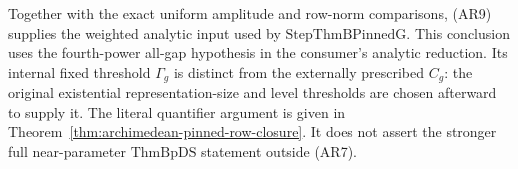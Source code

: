 Together with the exact uniform amplitude and row-norm
comparisons, (AR9) supplies the weighted analytic input
used by \(\mathrm{StepThmBPinnedG}\).  This conclusion uses the fourth-power all-gap hypothesis in the
consumer's analytic reduction. Its internal fixed threshold
\(\Gamma_g\) is distinct from the externally prescribed
\(C_g\): the original existential representation-size and
level thresholds are chosen afterward to supply it.
The literal quantifier argument is given in
Theorem~\ref{thm:archimedean-pinned-row-closure}.
It does not assert the stronger full near-parameter
\(\mathrm{ThmBpDS}\) statement outside (AR7).
